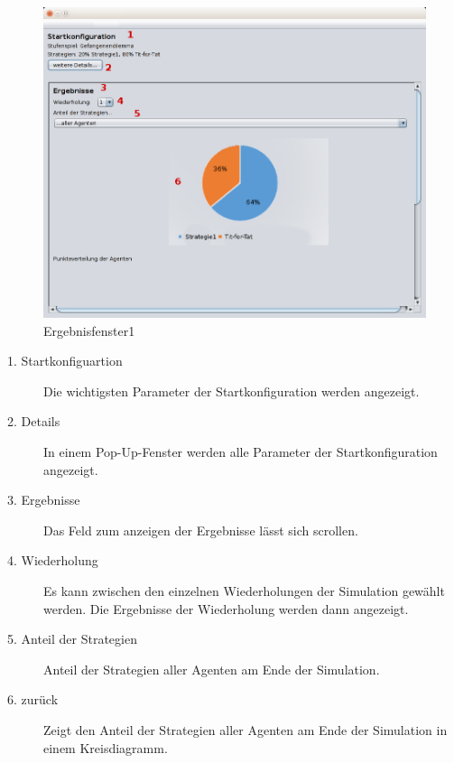 \begin{figure}[hp] 
  \centering
     \includegraphics[width=1.1\textwidth]{GUI_Entwurf/Ergebnisfenster1.png}
  \caption{Ergebnisfenster1}
  \label{fig:Bild7}
\end{figure}

\begin{description}

\item[1. Startkonfiguartion] Die wichtigsten Parameter der Startkonfiguration werden angezeigt.

\item[2. Details] In einem Pop-Up-Fenster werden alle Parameter der Startkonfiguration angezeigt.

\item[3. Ergebnisse] Das Feld zum anzeigen der Ergebnisse lässt sich scrollen.

\item[4. Wiederholung] Es kann zwischen den einzelnen Wiederholungen der Simulation gewählt werden. Die Ergebnisse der Wiederholung werden dann angezeigt.

\item[5. Anteil der Strategien] Anteil der Strategien aller Agenten am Ende der Simulation. 

\item[6. zurück] Zeigt den Anteil der Strategien aller Agenten am Ende der Simulation in einem Kreisdiagramm. 

\end{description}

